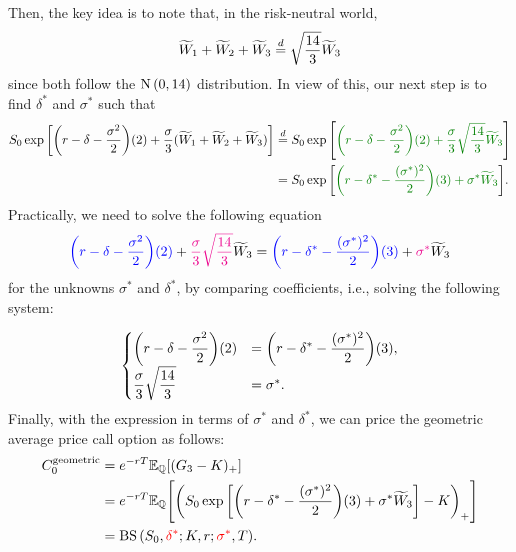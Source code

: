 \begin{enumerate}
Then, the key idea is to note that, in the risk-neutral world,
\[
\widetilde{W}_1+\widetilde{W}_2+\widetilde{W}_3\overset{d}=\sqrt{\frac{14}{3}}\widetilde{W}_3
\]
since both follow the \(\operatorname{N}\qty(0,14)\) distribution. In view of this, our next
step is to find \(\delta^{*}\) and \(\sigma^*\) such that
\begin{align*}
S_0\exp\qty[\qty(r-\delta-\frac{\sigma^2}{2})(2)+\frac{\sigma}{3}(\widetilde{W}_1+\widetilde{W}_2+\widetilde{W}_3)]
&\eqd 
S_0\exp\qty[\gc{\qty(r-\delta-\frac{\sigma^2}{2})(2)+\frac{\sigma}{3}\sqrt{\frac{14}{3}}\widetilde{W}_3}]\\
&= S_0\exp\qty[\gc{\qty(r-\delta^{*}-\frac{(\sigma^{*})^2}{2})(3)+\sigma^{*}\widetilde{W}_3}].
\end{align*}
Practically, we need to solve the following equation
\[
{\color{blue}\qty(r-\delta-\frac{\sigma^2}{2})(2)}+{\color{magenta}\frac{\sigma}{3}\sqrt{\frac{14}{3}}}\widetilde{W}_3
={\color{blue}\qty(r-\delta^{*}-\frac{(\sigma^{*})^2}{2})(3)}+{\color{magenta}\sigma^{*}}\widetilde{W}_3
\]
for the unknowns \(\sigma^{*}\) and \(\delta^{*}\), by comparing coefficients,
i.e., solving the following system:

\[
\begin{cases}
\displaystyle \qty(r-\delta-\frac{\sigma^2}{2})(2)&=\displaystyle \qty(r-\delta^{*}-\frac{(\sigma^{*})^2}{2})(3),\\
\displaystyle \frac{\sigma}{3}\sqrt{\frac{14}{3}}&=\sigma^{*}.\\
\end{cases}
\]
Finally, with the expression in terms of \(\sigma^*\) and \(\delta^*\), we can
price the geometric average price call option as follows:
\begin{align*}
C_0^{\mathrm{geometric}}&=e^{-rT}\mathbb{E}_{\mathbb{Q}}\qty[(G_3-K)_{+}]\\
&=e^{-rT}\mathbb{E}_{\mathbb{Q}}\qty[\qty(S_0\exp\qty[\qty(r-\delta^{*}-\frac{(\sigma^{*})^2}{2})(3)+\sigma^{*}\widetilde{W}_3]-K)_{+}] \\
&=\operatorname{BS}\qty(S_0,{\color{red}\delta^*};K,r;{\color{red}\sigma^*},T).
\end{align*}
\end{enumerate}
